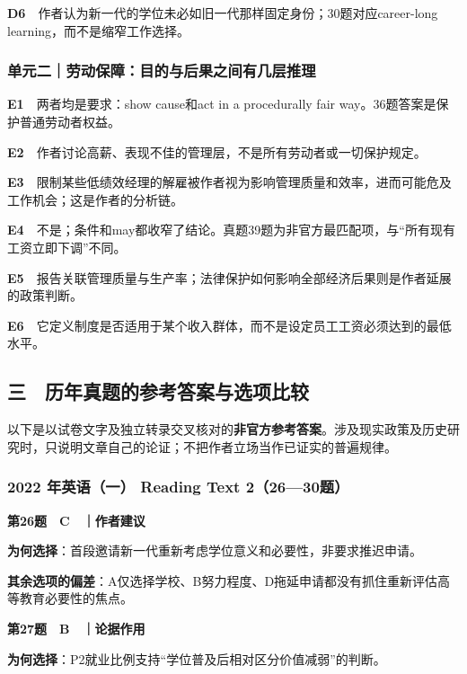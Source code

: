 \documentclass[
  11pt,
]{ctexart}
\begin{document}
\textbf{D6}　作者认为新一代的学位未必如旧一代那样固定身份；30题对应career-long
learning，而不是缩窄工作选择。

\subsubsection{单元二｜劳动保障：目的与后果之间有几层推理}\label{ux5355ux5143ux4e8cux52b3ux52a8ux4fddux969cux76eeux7684ux4e0eux540eux679cux4e4bux95f4ux6709ux51e0ux5c42ux63a8ux7406-1}

\textbf{E1}　两者均是要求：show cause和act in a procedurally fair
way。36题答案是保护普通劳动者权益。

\textbf{E2}　作者讨论高薪、表现不佳的管理层，不是所有劳动者或一切保护规定。

\textbf{E3}　限制某些低绩效经理的解雇被作者视为影响管理质量和效率，进而可能危及工作机会；这是作者的分析链。

\textbf{E4}　不是；条件和may都收窄了结论。真题39题为非官方最匹配项，与``所有现有工资立即下调''不同。

\textbf{E5}　报告关联管理质量与生产率；法律保护如何影响全部经济后果则是作者延展的政策判断。

\textbf{E6}　它定义制度是否适用于某个收入群体，而不是设定员工工资必须达到的最低水平。

\subsection{三　历年真题的参考答案与选项比较}\label{ux4e09-ux5386ux5e74ux771fux9898ux7684ux53c2ux8003ux7b54ux6848ux4e0eux9009ux9879ux6bd4ux8f83}

以下是以试卷文字及独立转录交叉核对的\textbf{非官方参考答案}。涉及现实政策及历史研究时，只说明文章自己的论证；不把作者立场当作已证实的普遍规律。

\subsubsection{2022 年英语（一） Reading Text
2（26---30题）}\label{ux5e74ux82f1ux8bedux4e00-reading-text-22630ux9898}

\textbf{第26题　C　｜作者建议}

\textbf{为何选择}：首段邀请新一代重新考虑学位意义和必要性，非要求推迟申请。

\textbf{其余选项的偏差}：A仅选择学校、B努力程度、D拖延申请都没有抓住重新评估高等教育必要性的焦点。

\textbf{第27题　B　｜论据作用}

\textbf{为何选择}：P2就业比例支持``学位普及后相对区分价值减弱''的判断。
\end{document}
